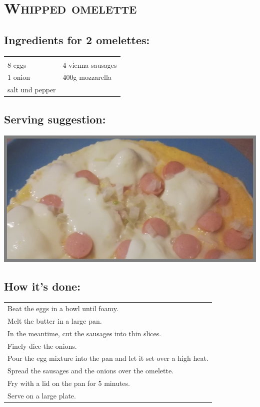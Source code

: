 \section{\textsc{Whipped omelette}}

\subsection*{Ingredients for 2 omelettes:}

\begin{tabular}{p{7.5cm} p{7.5cm}}
	& \\
	8 eggs & 4 vienna sausages \\
	1 onion & 400g mozzarella \\
	salt und pepper &
\end{tabular}

\subsection*{Serving suggestion:}

\includegraphics[width=\textwidth]{img/omlett_gewienert.jpg} \cite{omlettwiener}

\subsection*{How it's done:}

\begin{tabular}{p{15cm}}
  \\
  Beat the eggs in a bowl until foamy.\\
  Melt the butter in a large pan.\\
  In the meantime, cut the sausages into thin slices.\\
  Finely dice the onions.\\
  Pour the egg mixture into the pan and let it set over a high heat.\\
  Spread the sausages and the onions over the omelette.\\
  Fry with a lid on the pan for 5 minutes.\\
  Serve on a large plate.
\end{tabular}

